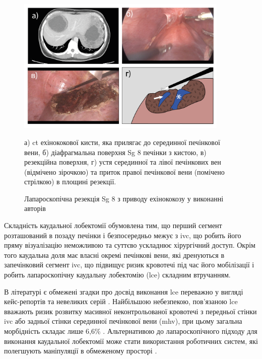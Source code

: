 \begin{figure}[h]
\caption{Лапароскопічна резекція Sg 8 з приводу ехінококозу у виконанні авторів}

\includegraphics[width=0.9\textwidth]{Illustrations/Chapter_01/Complex_localisation_Sg8.png}
\label{fig:Complex_localisation_Sg8}

\medskip
\small
а) \acrshort{ct} ехінококової кисти, яка прилягає до  серединної печінкової вени, б) діафрагмальна поверхня Sg 8 печінки з кистою, в) резекційна поверхня, г) устя серединної та лівої печінкових вен (відмічено зірочкою) та приток правої печінкової вени (помічено стрілкою) в площині резекції.

\end{figure}





Складність каудальної лобектомії обумовлена тим, що перший сегмент розташований в позаду печінки і безпосередньо межує з \acrshort{ivc}, що робить його пряму візуалізацію неможливою та суттєво ускладнює хірургічний доступ. Окрім того каудальна доля має власні окремі печінкові вени, які дренуються в запечінковий сегмент \acrshort{ivc}, що підвищує ризик кровотечі під час його мобілізації і робить лапароскопічну каудальну лобектомію (\acrshort{lce}) складним втручанням. 
    
В літературі є обмежені згадки про досвід виконання \acrshort{lce} переважно у вигляді кейс-репортів та невеликих серій \cite{Machado2018, Cheung2016, Koh2017, Jin2018}. Найбільшою небезпекою, пов'язаною \acrshort{lce} вважають ризик розвитку масивної неконтрольованої кровотечі з передньої стінки \acrshort{ivc} або задньої стінки серединної печінкової вени (\acrshort{mhv}), при цьому загальна морбідність складає лише 6,6\% \cite{Araki2018}. Альтернативою до лапароскопічного підходу для виконання каудальної лобектомії може стати використання роботичних систем, які полегшують маніпуляції в обмеженому просторі \cite{Marino2018a}.

